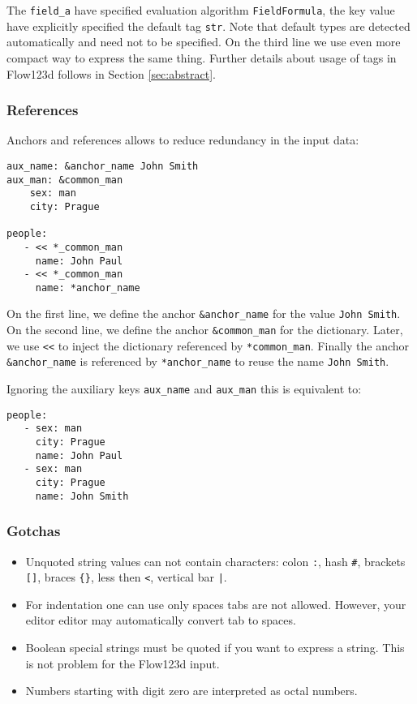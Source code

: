 The \verb'field_a' have specified evaluation algorithm \verb'FieldFormula', the key value have explicitly specified the default tag \verb'str'.
Note that default types are detected automatically and need not to be specified. On the third line we use even more compact way to 
express the same thing. Further details about usage of tags in Flow123d follows in Section \ref{sec:abstract}.

\subsubsection{References}
Anchors and references allows to reduce redundancy in the input data:
\begin{verbatim}
aux_name: &anchor_name John Smith
aux_man: &common_man
    sex: man
    city: Prague
    
people:
   - << *_common_man
     name: John Paul
   - << *_common_man
     name: *anchor_name
\end{verbatim}
On the first line, we define the anchor \verb'&anchor_name' for the value \verb'John Smith'. On the second line, 
we define the anchor \verb'&common_man' for the dictionary. Later, we use \verb'<<' to inject the dictionary 
referenced by \verb'*common_man'. Finally the anchor \verb'&anchor_name' is referenced by \verb'*anchor_name' to reuse the 
name \verb'John Smith'.

Ignoring the auxiliary keys \verb'aux_name' and \verb'aux_man' this is equivalent to:
\begin{verbatim}
people:
   - sex: man
     city: Prague
     name: John Paul
   - sex: man
     city: Prague
     name: John Smith
\end{verbatim}


\subsubsection{Gotchas}
\begin{itemize}
 \item Unquoted string values can not contain characters: colon \verb':', hash \verb'#', 
 brackets \verb'[]', braces \verb'{}', less then \verb'<', vertical bar \verb'|'.
 \item For indentation one can use only spaces tabs are not allowed. However, your editor editor may automatically convert tab to spaces.
 \item Boolean special strings must be quoted if you want to express a string. This is not problem for the Flow123d input.
 \item Numbers starting with digit zero are interpreted as octal numbers. 
\end{itemize}


